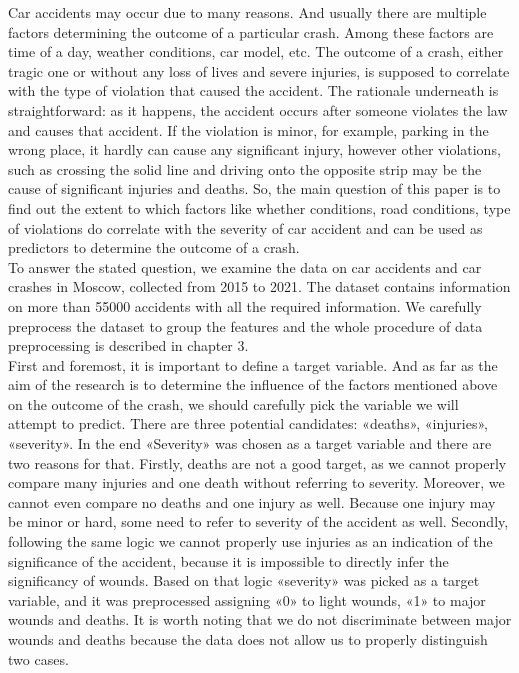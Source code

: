 Car accidents may occur due to many reasons. And usually there are multiple factors determining the outcome of a particular crash.
Among these factors are time of a day, weather conditions, car model, etc.
The outcome of a crash, either tragic one or without any loss of lives and severe injuries,
is supposed to correlate with the type of violation that caused the accident.
The rationale underneath is straightforward: as it happens, the accident occurs after someone violates the law and causes that accident.
If the violation is minor, for example, parking in the wrong place, it hardly can cause any significant injury,
however other violations, such as crossing the solid line and driving onto the opposite strip may be the cause of significant injuries and deaths.
So, the main question of this paper is to find out the extent to which factors like whether
conditions, road conditions, type of violations do correlate with the severity of car accident and
can be used as predictors to determine the outcome of a crash. \\
To answer the stated question, we examine the data on car accidents and car crashes in Moscow, collected from 2015 to 2021.
The dataset contains information on more than 55000 accidents with all the required information.
We carefully preprocess the dataset to group the features and the whole procedure of data preprocessing is described in chapter 3. \\
First and foremost, it is important to define a target variable.
And as far as the aim of the research is to determine the influence of the factors mentioned above on the outcome of the crash,
we should carefully pick the variable we will attempt to predict. There are three potential candidates: «deaths», «injuries», «severity».
In the end «Severity» was chosen as a target variable and there are two reasons for that.
Firstly, deaths are not a good target, as we cannot properly compare many injuries and one death without referring to severity.
Moreover, we cannot even compare no deaths and one injury as well.
Because one injury may be minor or hard, some need to refer to severity of the accident as well.
Secondly, following the same logic we cannot properly use injuries as an indication of the significance of the accident,
because it is impossible to directly infer the significancy of wounds.
Based on that logic «severity» was picked as a target variable, and it was preprocessed assigning «0» to light wounds, «1» to major wounds and deaths.
It is worth noting that we do not discriminate between major wounds and deaths because the data does not allow us to properly distinguish two cases.
